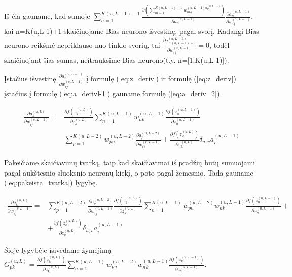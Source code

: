 Iš čia gauname, kad sumoje $\sum_{n=1}^{K(u, L-1)+1} \frac{\partial (\sum_{m=1}^{K(u,L-1)+1} w_{mk}^{(u,L-1) a_m^{(u,L-1)}} )}{\partial a_n^{(u,L-1)}} \frac{\partial a_n^{(u,L-1)}}{\partial w_{ij}^{(v,L-1)}}$, kai n=K(u,L-1)+1 skaičiuojame Bias neurono išvestinę, pagal svorį. Kadangi Bias neurono reikšmė nepriklauso nuo tinklo svorių, tai $\frac{\partial a_{K(u,L-1)+1}^{(u,L-1)}}{\partial w_{ij}^{(v,L-1)}} = 0$, todėl skaičiuojant šias sumas, neįtrauksime Bias neurono(t.y. n=[1;K(u,L-1)]).

Įstačius išvestinę $\frac{\partial a_n^{(u,L-1)}}{\partial w_{ij}^{(v,L-1)}}$ į formulę (\ref{eq:z_deriv}) ir formulę (\ref{eq:z_deriv}) įstačius į formulę (\ref{eq:a_derivl-1}) gauname formulę (\ref{eq:a_deriv_2}).


\begin{equation} \label{eq:a_deriv_2}
  \begin{aligned}
    \frac{\partial a_k^{(u, L)}}{\partial w_{ij}^{(v,L-1)}} = &
      \frac{\partial f(z_k^{(u, L)})}{\partial z_k^{(u,L)}}\sum_{n=1}^{K(u, L-1)} w_{nk}^{(u,L-1)} \frac{\partial f(z_n^{(u, L-1)})}{\partial z_n^{(u,L-1)}} \\
    &\sum_{p=1}^{K(u, L-2)} w_{pn}^{(u,L-2)} \frac{\partial a_p^{(u,L-2)}}{\partial w_{ij}^{(v,L-1)}} +
    \frac{\partial f(z_k^{(u, L)})}{\partial z_k^{(u,L)}} \delta_{u,v}a_i^{(u,L-1)}
  \end{aligned}
\end{equation}

  Pakeičiame skaičiavimų tvarką, taip kad skaičiavimai iš pradžių būtų sumuojami pagal aukštesnio sluoksnio neuronų kiekį, o poto pagal žemesnio. Tada gauname (\ref{eq:pakeista_tvarka}) lygybę.



\begin{equation}\label{eq:pakeista_tvarka}
    \begin{aligned}
      \frac{\partial a_k^{(u, L)}}{\partial w_{ij}^{(v,L-1)}} = &
        \sum_{p=1}^{K(u, L-2)}
        \frac{\partial a_p^{(u,L-2)}}{\partial w_{ij}^{(v,L-1)}}\frac{\partial f(z_k^{(u, L)})}{\partial z_k^{(u,L)}}  \sum_{n=1}^{K(u, L-1)} w_{pn}^{(u,L-2)} w_{nk}^{(u,L-1)}\frac{\partial f(z_n^{(u, L-1)})}{\partial z_n^{(u,L-1)}} + \\
      & + \frac{\partial f(z_k^{(u, L)})}{\partial z_k^{(u,L)}} \delta_{u,v}a_i^{(u,L-1)}
   \end{aligned}
\end{equation}

Šioje lygybėje įsivedame žymėjimą $G_{pk}^{(u,L)} =
\frac{\partial f(z_k^{(u, L)})}{\partial z_k^{(u,L)}} \sum_{n=1}^{K(u, L-1)} w_{pn}^{(u,L-2)} w_{nk}^{(u,L-1)} \frac{\partial f(z_n^{(u, L-1)})}{\partial z_n^{(u,L-1)}}$.

